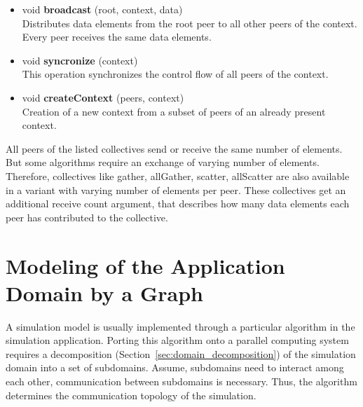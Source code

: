 \begin{itemize}
\item  void \textbf{broadcast} (root, context, data)\\
  Distributes data elements from the root peer to all other peers of
  the context. Every peer receives the same data elements.

\item  void \textbf{syncronize} (context)\\
  This operation synchronizes the control flow of all peers of the
  context.

\item  void \textbf{createContext} (peers, context)\\ 
  Creation of a new context from a subset of peers of an already
  present context.

\end{itemize}

\noindent All peers of the listed collectives send or receive the same number of
elements.  But some algorithms require an exchange of varying number
of elements. Therefore, collectives like gather, allGather, scatter,
allScatter are also available in a variant with varying number of
elements per peer. These collectives get an additional receive count
argument, that describes how many data elements each peer has
contributed to the collective.


\section{Modeling of the Application Domain by a Graph}
\label{sec:graph}
A simulation model is usually implemented through a particular
algorithm in the simulation application.  Porting this algorithm onto
a parallel computing system requires a decomposition
(Section~\ref{sec:domain_decomposition}) of the simulation domain into
a set of subdomains.  Assume, subdomains need to interact among each
other, communication between subdomains is necessary. Thus, the
algorithm determines the communication topology of the simulation.


